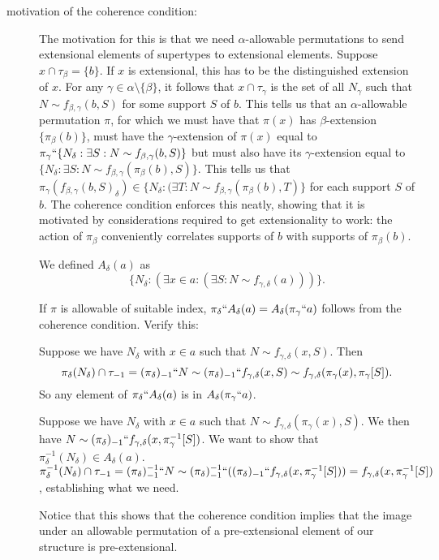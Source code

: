 \documentclass[112pt]{article}
\begin{document}
\begin{description}
\item[motivation of the coherence condition:]  The motivation for this is that we need $\alpha$-allowable permutations to send extensional elements of supertypes to extensional elements.  Suppose
$x \cap \tau_\beta = \{b\}$.  If $x$ is extensional, this has to be the distinguished extension of $x$.  For any $\gamma \in \alpha \setminus \{\beta\}$,
it follows that $x \cap \tau_\gamma$ is the set of all $N_\gamma$ such that $N \sim f_{\beta,\gamma}(b,S)$ for some support $S$ of $b$.  This tells us that an $\alpha$-allowable permutation $\pi$, for which we must have that $\pi(x)$ has $\beta$-extension $\{\pi_\beta(b)\}$, must have the  $\gamma$-extension of $\pi(x)$ equal to $\pi_\gamma``\{N_\delta:\exists S:N \sim f_{\beta,\gamma}(b,S)\}$
but must also have its $\gamma$-extension equal to $\{N_\delta:\exists S:N \sim f_{\beta,\gamma}(\pi_\beta(b),S)\}$.  This tells us that $\pi_\gamma(f_{\beta,\gamma}(b,S)_\delta) \in \{N_\delta:(\exists T:N \sim f_{\beta,\gamma}(\pi_\beta(b),T)\}$ for each support $S$ of $b$.  The coherence condition enforces this neatly, showing that it is motivated by considerations required to get extensionality to work: the action of $\pi_\beta$ conveniently correlates supports of $b$ with supports of $\pi_\beta(b)$.

We defined $A_\delta(a)$ as $$\{N_\delta:(\exists x \in a:(\exists S:N \sim f_{\gamma,\delta}(a)))\}.$$

If $\pi$ is allowable of suitable index, $\pi_\delta``A_\delta(a)= A_\delta(\pi_\gamma``a)$ follows from the coherence condition.  Verify this:

Suppose we have $N_\delta$ with $x \in a$ such that $N \sim f_{\gamma,\delta}(x,S)$.  Then $$\pi_\delta(N_\delta)  \cap \tau_{-1} = (\pi_\delta)_{-1}``N \sim (\pi_\delta)_{-1}``f_{\gamma,\delta}(x,S) \sim f_{\gamma,\delta}(\pi_\gamma(x),\pi_\gamma[S]).$$  So any element of $\pi_\delta``A_\delta(a)$ is in $A_\delta(\pi_\gamma``a)$.

Suppose we have $N_\delta$ with $x \in a$ such that $N \sim f_{\gamma,\delta}(\pi_\gamma(x),S)$.  We then have $N \sim (\pi_\delta)_{-1}``f_{\gamma,\delta}(x,\pi_\gamma^{-1}[S])$.  We want to show that $\pi_\delta^{-1}(N_\delta) \in A_\delta(a)$.  $\pi_\delta^{-1}(N_\delta) \cap \tau_{-1} = (\pi_\delta)_{-1}^{-1}``N \sim 
(\pi_\delta)_{-1}^{-1}``((\pi_\delta)_{-1}``f_{\gamma,\delta}(x,\pi_\gamma^{-1}[S])) = f_{\gamma,\delta}(x,\pi_\gamma^{-1}[S])$, establishing what we need.

Notice that this shows that the coherence condition implies that the image under an allowable permutation of a pre-extensional element of our structure is pre-extensional.


\end{description}
\end{document}
